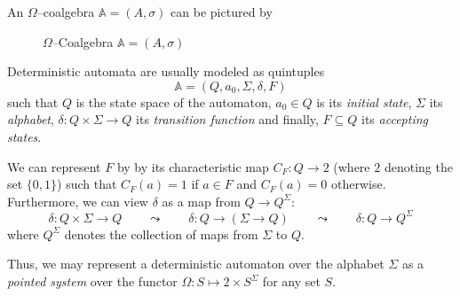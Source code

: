 An $\Omega$--coalgebra $\mathbb{A} = (A,\sigma)$ can be pictured by
\begin{figure}[h]
	\centering
	\caption{$\Omega$--Coalgebra $\mathbb{A} = (A,\sigma)$}
	\label{fig:}
\end{figure}



\begin{example}[Automata]
	\textsf{Deterministic automata} are usually modeled as quintuples 
	\[
		\mathbb{A} = 
		(Q,a_0,\Sigma,\delta,F)
	\]
	such that $Q$ is the state space of the automaton, 
	$a_0 \in Q$ is its \textit{initial state}, 
	$\Sigma$ its \textit{alphabet}, 
	$\delta \colon Q \times \Sigma \to Q$ its \textit{transition function} and finally, 
	$F \subseteq Q$ its \textit{accepting states}. 


	We can represent $F$ by by its characteristic map $C_F \colon Q \to 2$ (where $2$ denoting the set $\{0,1\}$) such that $C_F (a) = 1$ if $a \in F$ and $C_F (a) = 0$ otherwise. 
	Furthermore, we can view $\delta$ as a map from $Q \to Q^\Sigma$:
	\[
		\delta \colon Q \times \Sigma \to Q 
			\qquad \leadsto \qquad 
		\delta \colon Q \to (\Sigma \to Q) 
			\qquad \leadsto \qquad 
		\delta \colon Q \to Q^\Sigma
	\]
	where $Q^\Sigma$ denotes the collection of maps from $\Sigma$ to $Q$. 

	Thus, 
	we may represent a deterministic automaton over the alphabet $\Sigma$ as a {\color{purple} \textit{pointed system}} over the functor $\Omega \colon S \mapsto 2 \times S^\Sigma$ for any set $S$.
\end{example}




